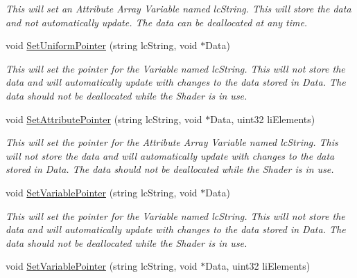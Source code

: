 \begin{DoxyCompactItemize}
\begin{DoxyCompactList}\small\item\em This will set an Attribute Array Variable named lcString. This will store the data and not automatically update. The data can be deallocated at any time. \end{DoxyCompactList}\item 
\hypertarget{classc_shader_program_abd7136989bf490d648b0eab6ce3eccf8}{
void \hyperlink{classc_shader_program_abd7136989bf490d648b0eab6ce3eccf8}{SetUniformPointer} (string lcString, void $\ast$Data)}
\label{classc_shader_program_abd7136989bf490d648b0eab6ce3eccf8}

\begin{DoxyCompactList}\small\item\em This will set the pointer for the Variable named lcString. This will not store the data and will automatically update with changes to the data stored in Data. The data should not be deallocated while the Shader is in use. \end{DoxyCompactList}\item 
\hypertarget{classc_shader_program_af3f096988b319a510178eac210955e1c}{
void \hyperlink{classc_shader_program_af3f096988b319a510178eac210955e1c}{SetAttributePointer} (string lcString, void $\ast$Data, uint32 liElements)}
\label{classc_shader_program_af3f096988b319a510178eac210955e1c}

\begin{DoxyCompactList}\small\item\em This will set the pointer for the Attribute Array Variable named lcString. This will not store the data and will automatically update with changes to the data stored in Data. The data should not be deallocated while the Shader is in use. \end{DoxyCompactList}\item 
\hypertarget{classc_shader_program_a1e1afdd0656a4b7ee567f73e01069c1d}{
void \hyperlink{classc_shader_program_a1e1afdd0656a4b7ee567f73e01069c1d}{SetVariablePointer} (string lcString, void $\ast$Data)}
\label{classc_shader_program_a1e1afdd0656a4b7ee567f73e01069c1d}

\begin{DoxyCompactList}\small\item\em This will set the pointer for the Variable named lcString. This will not store the data and will automatically update with changes to the data stored in Data. The data should not be deallocated while the Shader is in use. \end{DoxyCompactList}\item 
\hypertarget{classc_shader_program_a93ab1d3e9d7ef349ed3886a8832b30b7}{
void \hyperlink{classc_shader_program_a93ab1d3e9d7ef349ed3886a8832b30b7}{SetVariablePointer} (string lcString, void $\ast$Data, uint32 liElements)}
\label{classc_shader_program_a93ab1d3e9d7ef349ed3886a8832b30b7}


\end{DoxyCompactItemize}

